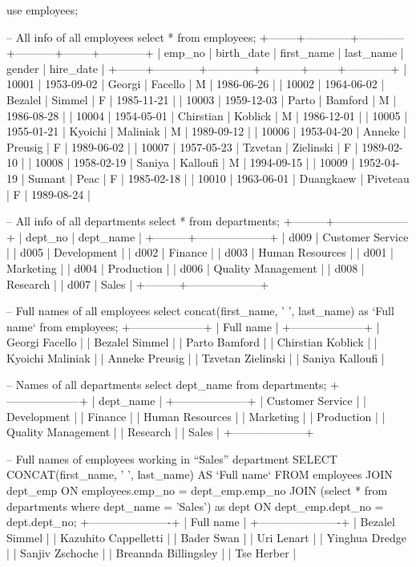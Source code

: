 use employees;

-- All info of all employees
select * from employees;
+--------+------------+------------+-----------+--------+------------+
| emp_no | birth_date | first_name | last_name | gender | hire_date  |
+--------+------------+------------+-----------+--------+------------+
|  10001 | 1953-09-02 | Georgi     | Facello   | M      | 1986-06-26 |
|  10002 | 1964-06-02 | Bezalel    | Simmel    | F      | 1985-11-21 |
|  10003 | 1959-12-03 | Parto      | Bamford   | M      | 1986-08-28 |
|  10004 | 1954-05-01 | Chirstian  | Koblick   | M      | 1986-12-01 |
|  10005 | 1955-01-21 | Kyoichi    | Maliniak  | M      | 1989-09-12 |
|  10006 | 1953-04-20 | Anneke     | Preusig   | F      | 1989-06-02 |
|  10007 | 1957-05-23 | Tzvetan    | Zielinski | F      | 1989-02-10 |
|  10008 | 1958-02-19 | Saniya     | Kalloufi  | M      | 1994-09-15 |
|  10009 | 1952-04-19 | Sumant     | Peac      | F      | 1985-02-18 |
|  10010 | 1963-06-01 | Duangkaew  | Piveteau  | F      | 1989-08-24 |

-- All info of all departments
select * from departments;
+---------+--------------------+
| dept_no | dept_name          |
+---------+--------------------+
| d009    | Customer Service   |
| d005    | Development        |
| d002    | Finance            |
| d003    | Human Resources    |
| d001    | Marketing          |
| d004    | Production         |
| d006    | Quality Management |
| d008    | Research           |
| d007    | Sales              |
+---------+--------------------+

-- Full names of all employees
select concat(first_name, ' ', last_name) as `Full name` from employees;
+--------------------+
| Full name          |
+--------------------+
| Georgi Facello     |
| Bezalel Simmel     |
| Parto Bamford      |
| Chirstian Koblick  |
| Kyoichi Maliniak   |
| Anneke Preusig     |
| Tzvetan Zielinski  |
| Saniya Kalloufi    |

-- Names of all departments
select dept_name from departments;
+--------------------+
| dept_name          |
+--------------------+
| Customer Service   |
| Development        |
| Finance            |
| Human Resources    |
| Marketing          |
| Production         |
| Quality Management |
| Research           |
| Sales              |
+--------------------+

-- Full names of employees working in “Sales” department
SELECT 
    CONCAT(first_name, ' ', last_name) AS `Full name`
FROM
    employees
        JOIN
    dept_emp ON employees.emp_no = dept_emp.emp_no
        JOIN
    (select * from departments where dept_name = 'Sales') as dept ON dept_emp.dept_no = dept.dept_no;
+----------------------+
| Full name            |
+----------------------+
| Bezalel Simmel       |
| Kazuhito Cappelletti |
| Bader Swan           |
| Uri Lenart           |
| Yinghua Dredge       |
| Sanjiv Zschoche      |
| Breannda Billingsley |
| Tse Herber           |

